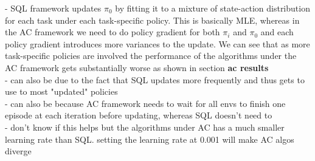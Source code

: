 \documentclass[12pt]{report}
\begin{document}
- SQL framework updates $\pi_0$ by fitting it to a mixture of state-action distribution for each task under each task-specific policy. This is basically MLE, whereas in the AC framework we need to do policy gradient for both $\pi_i$ and $\pi_0$ and each policy gradient introduces more variances to the update. We can see that as more task-specific policies are involved the performance of the algorithms under the AC framework gets substantially worse as shown in section \textbf{ac results}\\

- can also be due to the fact that SQL updates more frequently and thus gets to use to most "updated" policies\\

- can also be because AC framework needs to wait for all envs to finish one episode at each iteration before updating, whereas SQL doesn't need to\\

- don't know if this helps but the algorithms under AC has a much smaller learning rate than SQL. setting the learning rate at 0.001 will make AC algos diverge\\





\end{document}
